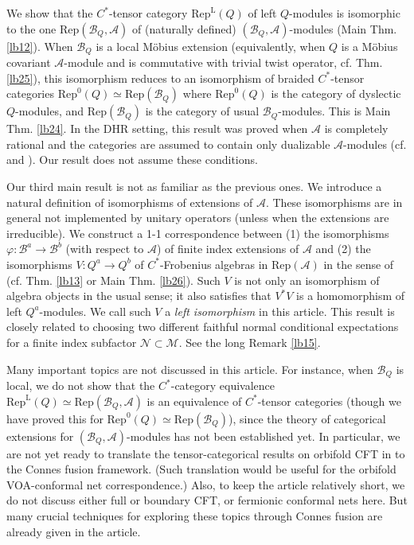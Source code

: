 \documentclass[11pt,b5paper,notitlepage]{article}
\theoremstyle{definition}
\theoremstyle{plain}
\newcommand{\mc}{\mathcal}
\newcommand{\Rep}{\mathrm{Rep}}
\newcommand{\RepA}{\mathrm{Rep}(\mathcal A)}
\newcommand{\RepL}{\mathrm{Rep}^{\mathrm{L}}}
\numberwithin{equation}{section}
\begin{document}
We show that the $C^*$-tensor category $\RepL(Q)$ of left $Q$-modules is isomorphic to the one $\Rep(\mc B_Q,\mc A)$ of (naturally defined) $(\mc B_Q,\mc A)$-modules (Main Thm. \ref{lb12}). When $\mc B_Q$ is a local M\"obius extension (equivalently, when $Q$ is a M\"obius covariant $\mc A$-module and is commutative with trivial twist operator, cf. Thm. \ref{lb25}), this isomorphism reduces to an isomorphism of braided $C^*$-tensor categories $\Rep^0(Q)\simeq\Rep(\mc B_Q)$ where $\Rep^0(Q)$ is the category of dyslectic $Q$-modules, and $\Rep(\mc B_Q)$ is the category of usual $\mc B_Q$-modules. This is Main Thm. \ref{lb24}. In the DHR setting, this result was proved when $\mc A$ is completely rational and the categories are assumed to contain only dualizable $\mc A$-modules (cf. \cite{Mug10} and \cite[Prop. 6.4]{BKL15}). Our result does not assume these conditions.
	
	
Our third main result is not as familiar as the previous ones. We introduce a natural definition of isomorphisms of extensions of $\mc A$. These isomorphisms are in general not implemented by unitary operators (unless when the extensions are irreducible).  We construct a 1-1 correspondence between (1) the isomorphisms $\varphi:\mc B^a\rightarrow\mc B^b$ (with respect to $\mc A$)  of finite index extensions of $\mc A$ and (2) the isomorphisms $V:Q^a\rightarrow Q^b$ of $C^*$-Frobenius algebras in $\RepA$ in the sense of \cite{NY18} (cf. Thm. \ref{lb13} or Main Thm. \ref{lb26}). Such  $V$ is not only an isomorphism of algebra objects in the usual sense; it also satisfies that $V^*V$ is a homomorphism of left $Q^a$-modules. We call such $V$ a \textit{left isomorphism} in this article. This result is closely related to choosing two different faithful normal conditional expectations for a finite index subfactor $\mc N\subset\mc M$. See the long Remark \ref{lb15}.



Many important topics are not discussed in this article. For instance, when $\mc B_Q$ is local, we do not show that the $C^*$-category equivalence $\RepL(Q)\simeq\Rep(\mc B_Q,\mc A)$ is an equivalence of $C^*$-tensor categories (though we have proved this for $\Rep^0(Q)\simeq \Rep(\mc B_Q)$), since the theory of categorical extensions for $(\mc B_Q,\mc A)$-modules has not been established yet. In particular, we are not yet ready to translate the tensor-categorical results on orbifold CFT in \cite{Mug05} to the Connes fusion framework. (Such translation would be useful for the orbifold VOA-conformal net correspondence.) Also, to keep the article relatively short, we do not discuss either full or boundary CFT, or  fermionic conformal nets here. But many crucial  techniques for exploring these topics through Connes fusion are already given in the article.
\end{document}
